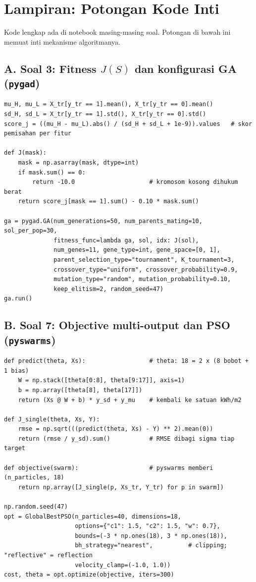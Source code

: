 \newpage
\section{Lampiran: Potongan Kode Inti}
Kode lengkap ada di notebook masing-masing soal. Potongan di bawah ini memuat inti mekanisme algoritmanya.

\subsection*{A. Soal 3: Fitness $J(S)$ dan konfigurasi GA (\texttt{pygad})}
\begin{lstlisting}
mu_H, mu_L = X_tr[y_tr == 1].mean(), X_tr[y_tr == 0].mean()
sd_H, sd_L = X_tr[y_tr == 1].std(), X_tr[y_tr == 0].std()
score_j = ((mu_H - mu_L).abs() / (sd_H + sd_L + 1e-9)).values   # skor pemisahan per fitur

def J(mask):
    mask = np.asarray(mask, dtype=int)
    if mask.sum() == 0:
        return -10.0                     # kromosom kosong dihukum berat
    return score_j[mask == 1].sum() - 0.10 * mask.sum()

ga = pygad.GA(num_generations=50, num_parents_mating=10, sol_per_pop=30,
              fitness_func=lambda ga, sol, idx: J(sol),
              num_genes=11, gene_type=int, gene_space=[0, 1],
              parent_selection_type="tournament", K_tournament=3,
              crossover_type="uniform", crossover_probability=0.9,
              mutation_type="random", mutation_probability=0.10,
              keep_elitism=2, random_seed=47)
ga.run()
\end{lstlisting}

\subsection*{B. Soal 7: Objective multi-output dan PSO (\texttt{pyswarms})}
\begin{lstlisting}
def predict(theta, Xs):                  # theta: 18 = 2 x (8 bobot + 1 bias)
    W = np.stack([theta[0:8], theta[9:17]], axis=1)
    b = np.array([theta[8], theta[17]])
    return (Xs @ W + b) * y_sd + y_mu    # kembali ke satuan kWh/m2

def J_single(theta, Xs, Y):
    rmse = np.sqrt(((predict(theta, Xs) - Y) ** 2).mean(0))
    return (rmse / y_sd).sum()           # RMSE dibagi sigma tiap target

def objective(swarm):                    # pyswarms memberi (n_particles, 18)
    return np.array([J_single(p, Xs_tr, Y_tr) for p in swarm])

np.random.seed(47)
opt = GlobalBestPSO(n_particles=40, dimensions=18,
                    options={"c1": 1.5, "c2": 1.5, "w": 0.7},
                    bounds=(-3 * np.ones(18), 3 * np.ones(18)),
                    bh_strategy="nearest",          # clipping; "reflective" = reflection
                    velocity_clamp=(-1.0, 1.0))
cost, theta = opt.optimize(objective, iters=300)
\end{lstlisting}


